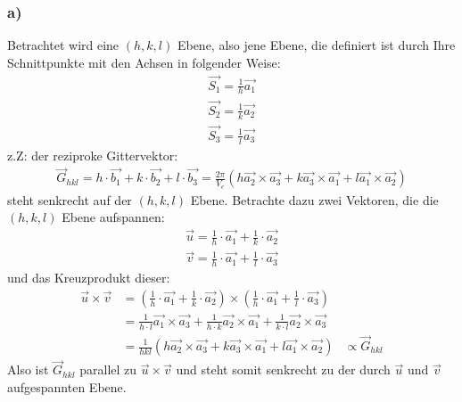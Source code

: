 \documentclass[11pt]{article}
\begin{document}
\subsubsection*{a)}
Betrachtet wird eine $(h,k,l)$ Ebene, also jene Ebene, die definiert ist durch Ihre Schnittpunkte mit den Achsen in folgender Weise:
\begin{align*}
\vec{S_1}=\frac{1}{h}\vec{a_1}\\
\vec{S_2}=\frac{1}{k}\vec{a_2}\\
\vec{S_3}=\frac{1}{l}\vec{a_3}
\end{align*}
z.Z: der reziproke Gittervektor:
\begin{align*}
\vec G_{hkl}=h\cdot\vec{b_1}+k\cdot\vec{b_2}+l\cdot\vec{b_3} = \frac{2\pi}{V_e}(h\vec{a_2}\times\vec{a_3}+k\vec{a_3}\times\vec{a_1}+l\vec{a_1}\times\vec{a_2})
\end{align*}
steht senkrecht auf der $(h,k,l)$ Ebene. Betrachte dazu zwei Vektoren, die die $(h,k,l)$ Ebene aufspannen:
\begin{align*}
\vec{u}=\frac{1}{h}\cdot\vec{a_1}+\frac{1}{k}\cdot\vec{a_2}\\
\vec{v}=\frac{1}{h}\cdot\vec{a_1}+\frac{1}{l}\cdot\vec{a_3}
\end{align*}
und das Kreuzprodukt dieser:
\begin{align*}
\vec{u}\times\vec{v} &= (\frac{1}{h}\cdot\vec{a_1}+\frac{1}{k}\cdot\vec{a_2})\times(\frac{1}{h}\cdot\vec{a_1}+\frac{1}{l}\cdot\vec{a_3})\\
&= \frac{1}{h\cdot l}\vec{a_1}\times\vec{a_3}+\frac{1}{h\cdot k}\vec{a_2}\times\vec{a_1}+\frac{1}{k\cdot l}\vec{a_2}\times\vec{a_3}\\
&= \frac{1}{hkl}\left(h\vec{a_2}\times\vec{a_3}+k\vec{a_3}\times\vec{a_1}+l\vec{a_1}\times\vec{a_2}\right)
&\propto \vec G_{hkl}
\end{align*}
Also ist $\vec G_{hkl}$ parallel zu $\vec{u}\times\vec{v}$
und steht somit senkrecht zu der durch $\vec u$ und $\vec v$ aufgespannten Ebene.
\end{document}
